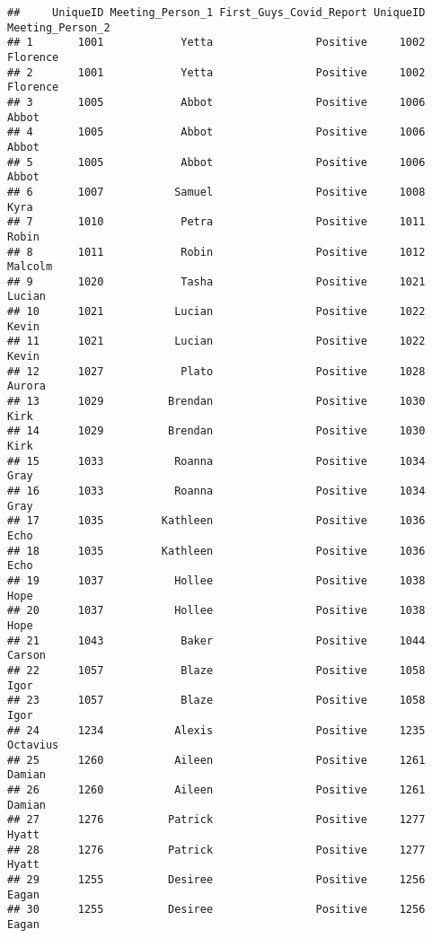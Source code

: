 \documentclass[
]{article}
\begin{document}
\begin{verbatim}
##     UniqueID Meeting_Person_1 First_Guys_Covid_Report UniqueID Meeting_Person_2
## 1       1001            Yetta                Positive     1002         Florence
## 2       1001            Yetta                Positive     1002         Florence
## 3       1005            Abbot                Positive     1006            Abbot
## 4       1005            Abbot                Positive     1006            Abbot
## 5       1005            Abbot                Positive     1006            Abbot
## 6       1007           Samuel                Positive     1008             Kyra
## 7       1010            Petra                Positive     1011            Robin
## 8       1011            Robin                Positive     1012          Malcolm
## 9       1020            Tasha                Positive     1021           Lucian
## 10      1021           Lucian                Positive     1022            Kevin
## 11      1021           Lucian                Positive     1022            Kevin
## 12      1027            Plato                Positive     1028           Aurora
## 13      1029          Brendan                Positive     1030             Kirk
## 14      1029          Brendan                Positive     1030             Kirk
## 15      1033           Roanna                Positive     1034             Gray
## 16      1033           Roanna                Positive     1034             Gray
## 17      1035         Kathleen                Positive     1036             Echo
## 18      1035         Kathleen                Positive     1036             Echo
## 19      1037           Hollee                Positive     1038             Hope
## 20      1037           Hollee                Positive     1038             Hope
## 21      1043            Baker                Positive     1044           Carson
## 22      1057            Blaze                Positive     1058             Igor
## 23      1057            Blaze                Positive     1058             Igor
## 24      1234           Alexis                Positive     1235         Octavius
## 25      1260           Aileen                Positive     1261           Damian
## 26      1260           Aileen                Positive     1261           Damian
## 27      1276          Patrick                Positive     1277            Hyatt
## 28      1276          Patrick                Positive     1277            Hyatt
## 29      1255          Desiree                Positive     1256            Eagan
## 30      1255          Desiree                Positive     1256            Eagan

\end{verbatim}
\end{document}
